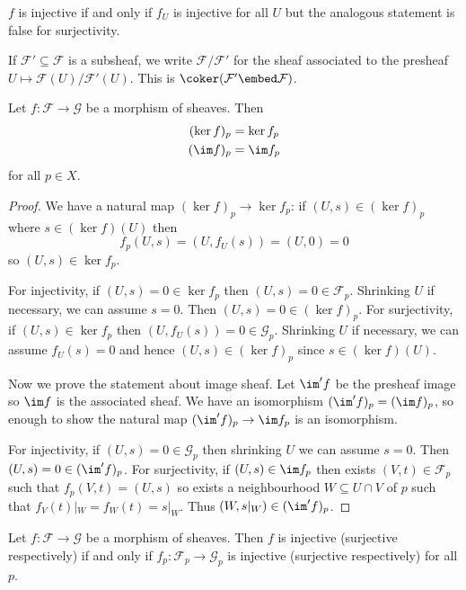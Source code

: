 \documentclass[a4paper]{article}
\newcommand{\sh}[1]{\mathcal{#1}} %
\begin{document}
\(f\) is injective if and only if \(f_U\) is injective for all \(U\) but the analogous statement is false for surjectivity.

If \(\sh F' \subseteq \sh F\) is a subsheaf, we write \(\sh F/\sh F'\) for the sheaf associated to the presheaf \(U \mapsto \sh F(U)/\sh F'(U)\). This is \(\coker (\sh F' \embed \sh F)\).

\begin{lemma}
  Let \(f: \sh F \to \sh G\) be a morphism of sheaves. Then
  \begin{align*}
    (\ker f)_p &= \ker f_p \\
    (\im f)_p &= \im f_p
  \end{align*}
  for all \(p \in X\).
\end{lemma}

\begin{proof}
  We have a natural map \((\ker f)_p \to \ker f_p\): if \((U, s) \in (\ker f)_p\) where \(s \in (\ker f)(U)\) then
  \[
    f_p(U, s) = (U, f_U(s)) = (U, 0) = 0
  \]
  so \((U, s) \in \ker f_p\).

  For injectivity, if \((U, s) = 0 \in \ker f_p\) then \((U, s) = 0 \in \sh F_p\). Shrinking \(U\) if necessary, we can assume \(s = 0\). Then \((U, s) = 0 \in (\ker f)_p\). For surjectivity, if \((U, s) \in \ker f_p\) then \((U, f_U(s)) = 0 \in \sh G_p\). Shrinking \(U\) if necessary, we can assume \(f_U(s) = 0\) and hence \((U, s) \in (\ker f)_p\) since \(s \in (\ker f)(U)\).

  Now we prove the statement about image sheaf. Let \(\im' f\) be the presheaf image so \(\im f\) is the associated sheaf. We have an isomorphism \((\im ' f)_p = (\im f)_p\), so enough to show the natural map \((\im' f)_p \to \im f_p\) is an isomorphism.

  For injectivity, if \((U, s) = 0 \in \sh G_p\) then shrinking \(U\) we can assume \(s = 0\). Then \((U, s) = 0 \in (\im' f)_p\). For surjectivity, if \((U, s) \in \im f_p\) then exists \((V, t) \in \sh F_p\) such that \(f_p(V, t) = (U, s)\) so exists a neighbourhood \(W \subseteq U \cap V\) of \(p\) such that \(f_V(t)|_W = f_W(t) = s|_W\). Thus \((W, s|_W) \in (\im' f)_p\).
\end{proof}

\begin{proposition}
  Let \(f: \sh F \to \sh G\) be a morphism of sheaves. Then \(f\) is injective (surjective respectively) if and only if \(f_p: \sh F_p \to \sh G_p\) is injective (surjective respectively) for all \(p\).
\end{proposition}
\end{document}
